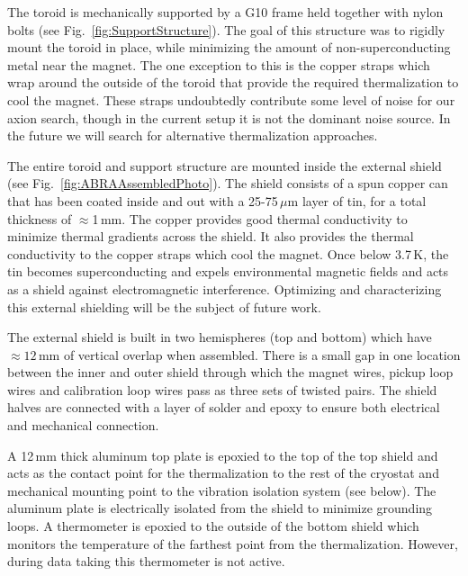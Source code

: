 \documentclass[aps,prd,amsmath,amssymb,reprint,superscriptaddress, nofootinbib,
]{revtex4-1}
\begin{document}
The toroid is mechanically supported by a G10 frame held together with nylon bolts (see Fig.~\ref{fig:SupportStructure}). The goal of this structure was to rigidly mount the toroid in place, while minimizing the amount of non-superconducting metal near the magnet. The one exception to this is the copper straps which wrap around the outside of the toroid that provide the required thermalization to cool the magnet. These straps undoubtedly contribute some level of noise for our axion search, though in the current setup it is not the dominant noise source. In the future we will search for alternative thermalization approaches.

The entire toroid and support structure are mounted inside the external shield (see Fig.~\ref{fig:ABRAAssembledPhoto}). The shield consists of a spun copper can that has been coated inside and out with a 25-75\,$\mu$m layer of tin, for a total thickness of $\approx$1\,mm. The copper provides good thermal conductivity to minimize thermal gradients across the shield. It also provides the thermal conductivity to the copper straps which cool the magnet. Once below 3.7\,K, the tin becomes superconducting and expels environmental magnetic fields and acts as a shield against electromagnetic interference. Optimizing and characterizing this external shielding will be the subject of future work.

The external shield is built in two hemispheres (top and bottom) which have $\approx12$\,mm of vertical overlap when assembled. There is a small gap in one location between the inner and outer shield through which the magnet wires, pickup loop wires and calibration loop wires pass as three sets of twisted pairs. The shield halves are connected with a layer of solder and epoxy to ensure both electrical and mechanical connection.

A 12\,mm thick aluminum top plate is epoxied to the top of the top shield and acts as the contact point for the thermalization to the rest of the cryostat and mechanical mounting point to the vibration isolation system (see below). The aluminum plate is electrically isolated from the shield to minimize grounding loops. A thermometer is epoxied to the outside of the bottom shield which monitors the temperature of the farthest point from the thermalization. However, during data taking this thermometer is not active.
\end{document}
